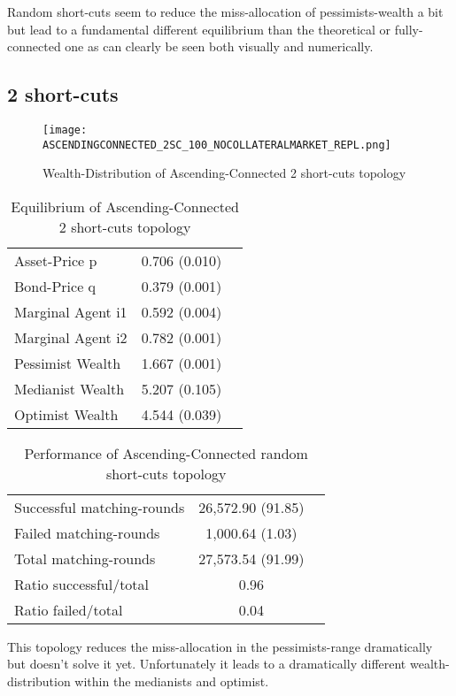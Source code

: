 \documentclass[Bachelorarbeit.tex]{subfiles}
\begin{document}
Random short-cuts seem to reduce the miss-allocation of pessimists-wealth a bit but lead to a fundamental different equilibrium than the theoretical or fully-connected one as can clearly be seen both visually and numerically.

\subsection{2 short-cuts}
\begin{figure}[H]
	\centering
  \texttt{[image: ASCENDINGCONNECTED\_2SC\_100\_NOCOLLATERALMARKET\_REPL.png]}
	\caption{Wealth-Distribution of Ascending-Connected 2 short-cuts topology}
	\label{fig:wealth_ASCENDINGCONNECTED_2SC_100_NOCOLLATERALMARKET_REPL}
\end{figure}

\begin{table}[H]
	\caption{Equilibrium of Ascending-Connected 2 short-cuts topology}
	\centering
	\begin{tabular} { l c r }
		\hline
		Asset-Price p & 0.706 (0.010) \\
		Bond-Price q & 0.379 (0.001) \\
		Marginal Agent i1 & 0.592 (0.004) \\
		Marginal Agent i2 & 0.782 (0.001) \\
		\hline
		Pessimist Wealth & 1.667 (0.001) \\
		Medianist Wealth & 5.207 (0.105) \\
		Optimist Wealth & 4.544 (0.039) \\
		\hline
	\end{tabular}
\end{table} 

\begin{table}[H]
	\caption{Performance of Ascending-Connected random short-cuts topology}
	\centering
	\begin{tabular} { l c r }
		\hline
		Successful matching-rounds & 26,572.90 (91.85) \\
		Failed matching-rounds & 1,000.64 (1.03) \\
		Total matching-rounds & 27,573.54 (91.99) \\
		\hline
		Ratio successful/total & 0.96 \\
		Ratio failed/total & 0.04 \\
		\hline
	\end{tabular}
\end{table}

This topology reduces the miss-allocation in the pessimists-range dramatically but doesn't solve it yet. Unfortunately it leads to a dramatically different wealth-distribution within the medianists and optimist.
\end{document}
